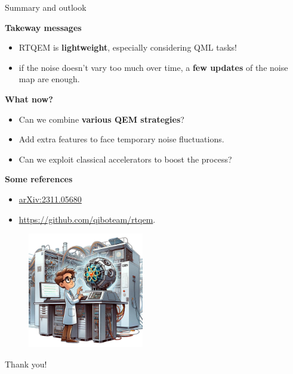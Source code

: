 \documentclass[8pt, xcolor={svgnames}, hyperref={linkcolor=black}, aspectratio=169]{beamer}
\begin{document}
\begin{frame}{Summary and outlook}
\begin{multicols}{2}
\textbf{Takeway messages}
\vspace{-0.3cm}
\begin{itemize}[noitemsep]
\item[\faSend] RTQEM is \textbf{lightweight}, especially considering QML tasks!
\item[\faSend] if the noise doesn't vary too much over time, a \textbf{few updates} of 
the noise map are enough.
\end{itemize}
\textbf{What now?}
\vspace{-0.3cm}
\begin{itemize}[noitemsep]
\item[\faGamepad] Can we combine \textbf{various QEM strategies}?
\item[\faGamepad] Add extra features to face temporary noise fluctuations.
\item[\faGamepad] Can we exploit classical accelerators to boost the process?
\end{itemize}
\textbf{Some references}
\vspace{-0.3cm}
\begin{itemize}[noitemsep]
\item[\faBook] \href{https://arxiv.org/abs/2311.05680}{arXiv:2311.05680}
\item[\faGithub] \href{https://github.com/qiboteam/rtqem}{https://github.com/qiboteam/rtqem}.
\end{itemize}
\begin{figure}
    \includegraphics[width=0.45\textwidth]{figures/me.png}
\end{figure}
\end{multicols}
\end{frame}

\begin{frame}
\centering
\Huge Thank you!
\end{frame}
\end{document}
